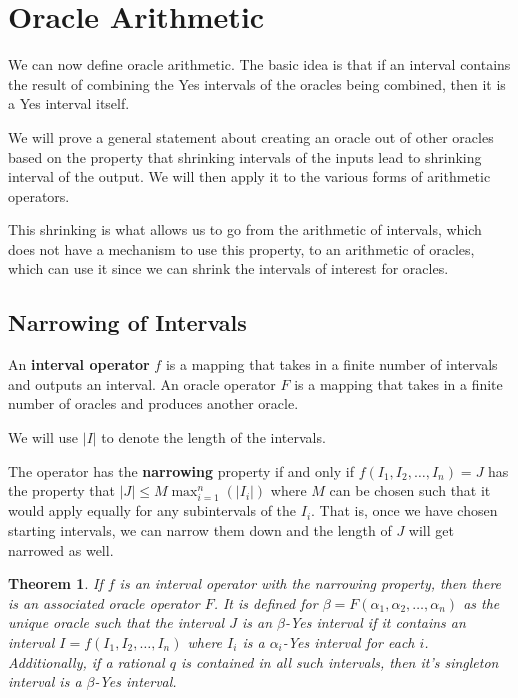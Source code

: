 \documentclass[12pt]{article}
\newtheorem{theorem}{Theorem}
\theoremstyle{remark}
\begin{document}
\section{Oracle Arithmetic}

We can now define oracle arithmetic. The basic idea is that if an interval contains the result of combining the Yes intervals of the oracles being combined, then it is a Yes interval itself. 

We will prove a general statement about creating an oracle out of other oracles based on the property that shrinking intervals of the inputs lead to shrinking interval of the output. We will then apply it to the various forms of arithmetic operators. 

This shrinking is what allows us to go from the arithmetic of intervals, which does not have a mechanism to use this property, to an arithmetic of oracles, which can use it since we can shrink the intervals of interest for oracles. 

\subsection{Narrowing of Intervals}

An \textbf{interval operator} $f$ is a mapping that takes in a finite number of intervals and outputs an interval. An oracle operator $F$ is a mapping that takes in a finite number of oracles and produces another oracle.

We will use $|I|$ to denote the length of the intervals. 

The operator has the \textbf{narrowing} property if and only if $f(I_1, I_2, \ldots, I_n)= J$ has the property that $|J| \leq M \max_{i=1}^{n} (|I_i|) $ where $M$ can be chosen such that it would apply equally for any subintervals of the $I_i$. That is, once we have chosen starting intervals, we can narrow them down and the length of $J$ will get narrowed as well. 

\begin{theorem}
If $f$ is an interval operator with the narrowing property, then there is an associated oracle operator $F$. It is defined for $\beta = F(\alpha_1, \alpha_2, \ldots, \alpha_n)$ as the unique oracle such that the interval $J$ is an $\beta$-Yes interval if it contains an interval $I = f(I_1, I_2, \ldots, I_n)$ where $I_i$ is a $\alpha_i$-Yes interval for each $i$. Additionally, if a rational $q$ is contained in all such intervals, then it's singleton interval is a $\beta$-Yes interval. 
\end{theorem}
\end{document}
